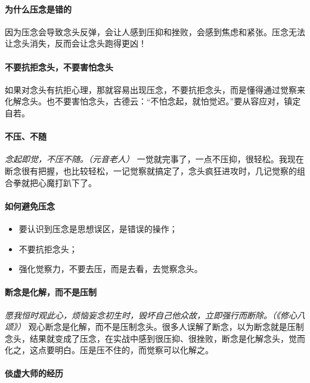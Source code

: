\paragraph{为什么压念是错的}

因为压念会导致念头反弹，会让人感到压抑和挫败，会感到焦虑和紧张。压念无法让念头消失，反而会让念头跑得更凶！

\paragraph{不要抗拒念头，不要害怕念头}

如果对念头有抗拒心理，那就容易出现压念，不要抗拒念头，而是懂得通过觉察来化解念头。也不要害怕念头，古德云：“不怕念起，就怕觉迟。”要从容应对，镇定自若。

\paragraph{不压、不随}

\textit{念起即觉，不压不随。（元音老人）} 一觉就完事了，一点不压抑，很轻松。我现在断念很有把握，也比较轻松，一记觉察就搞定了，念头疯狂进攻时，几记觉察的组合拳就把心魔打趴下了。

\paragraph{如何避免压念}

\begin{itemize}
    \item 要认识到压念是思想误区，是错误的操作；
    \item 不要抗拒念头；
    \item 强化觉察力，不要去压，而是去看，去觉察念头。
\end{itemize}

\paragraph{断念是化解，而不是压制}

\textit{愿我恒时观此心，烦恼妄念初生时，毁坏自己他众故，立即强行而断除。（《修心八颂》）} 观心断念是化解，而不是压制念头。很多人误解了断念，以为断念就是压制念头，结果就变成了压念，在实战中感到很压抑、很挫败，断念是化解念头，觉而化之，这点要明白。压是压不住的，而觉察可以化解之。

\paragraph{倓虚大师的经历}

